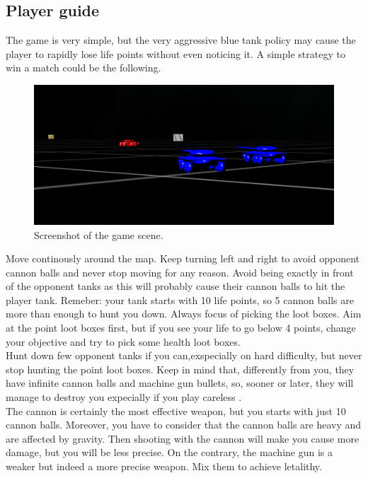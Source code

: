 \documentclass[14pt]{article}
\begin{document}
\subsection{Player guide} 
The game is very simple, but the very aggressive blue tank policy may cause the player to rapidly lose life points without even noticing it. A simple strategy to win a match could be the following. \\


\begin{figure}[H]
\includegraphics[width=12cm]{images/game.png}
\caption{Screenshot of the game scene.}
\label{img:machineGun}
\end{figure}

Move continously around the map. Keep turning left and right to avoid opponent cannon balls and never stop moving for any reason. Avoid being exactly in front of the opponent tanks as this will probably cause their cannon balls to hit the player tank. Remeber: your tank starts with 10 life points, so 5 cannon balls are more than enough to hunt you down. Always focus of picking the loot boxes. Aim at the point loot boxes first, but if you see your life to go below 4 points, change your objective and try to pick some health loot boxes.\\
Hunt down few opponent tanks if you can,exspecially on hard difficulty, but never stop hunting the point loot boxes. Keep in mind that, differently from you, they have infinite cannon balls and machine gun bullets, so, sooner or later, they will manage to destroy you expecially if you play careless . \\
The cannon is certainly the most effective weapon, but you starts with just 10 cannon balls. Moreover, you have to consider that the cannon balls are heavy and are affected by gravity. Then shooting with the cannon will make you cause more damage, but you will be less precise. On the contrary, the machine gun is a weaker but indeed a  more precise weapon. Mix them to achieve letalithy.
\end{document}
